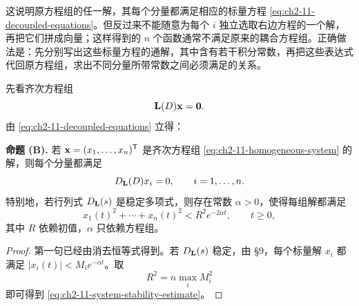 这说明原方程组的任一解，其每个分量都满足相应的标量方程 \eqref{eq:ch2-11-decoupled-equations}。但反过来不能随意为每个 \(i\) 独立选取右边方程的一个解，再把它们拼成向量；这样得到的 \(n\) 个函数通常不满足原来的耦合方程组。正确做法是：先分别写出这些标量方程的通解，其中含有若干积分常数，再把这些表达式代回原方程组，求出不同分量所带常数之间必须满足的关系。

先看齐次方程组
\begin{equation}
 \mat{L}(D)\vect{x}=\vect{0}.
 \label{eq:ch2-11-homogeneous-system}
\end{equation}
由 \eqref{eq:ch2-11-decoupled-equations} 立得：

\medskip
\noindent\textbf{命题 (B).}
若 \(\vect{x}=(x_1,\ldots,x_n)^{\mathsf T}\) 是齐次方程组 \eqref{eq:ch2-11-homogeneous-system} 的解，则每个分量都满足
\begin{equation}
 D_{\mathbf{L}}(D)x_i=0,
 \qquad i=1,\ldots,n.
 \label{eq:ch2-11-common-scalar-equation}
\end{equation}
特别地，若行列式 \(D_{\mathbf{L}}(s)\) 是稳定多项式，则存在常数 \(\alpha>0\)，使得每组解都满足
\begin{equation}
 x_1(t)^2+\cdots+x_n(t)^2<R^2e^{-2\alpha t},
 \qquad t\ge0,
 \label{eq:ch2-11-system-stability-estimate}
\end{equation}
其中 \(R\) 依赖初值，\(\alpha\) 只依赖方程组。

\begin{proof}
第一句已经由消去恒等式得到。若 \(D_{\mathbf{L}}(s)\) 稳定，由 §9，每个标量解 \(x_i\) 都满足
\(|x_i(t)|<M_ie^{-\alpha t}\)。取
\[
 R^2=n\max_iM_i^2
\]
即可得到 \eqref{eq:ch2-11-system-stability-estimate}。
\end{proof}

